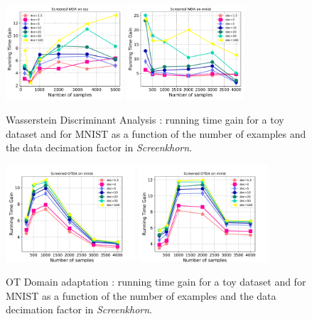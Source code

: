 \begin{figure}[t]
	\centering
	\includegraphics[width=0.39\textwidth]{./figs/wda_gain_toy.pdf}\hspace{1.5cm}
	\includegraphics[width=0.39\textwidth]{./figs/wda_gain_mnist.pdf}
	\caption{Wasserstein Discriminant Analysis : running time gain for a toy dataset and for MNIST as a function of the number of examples and the data decimation factor in \emph{Screenkhorn}.}
	\label{fig:wda}
\end{figure}
\begin{figure}[t]
	\centering

	\includegraphics[width=0.43\textwidth]{./figs/da_gain_mnist_regcl1.pdf}\hspace{1cm}
	\includegraphics[width=0.43\textwidth]{./figs/da_gain_mnist_regcl10.pdf}
	\caption{OT Domain adaptation : running time gain for a toy dataset and for MNIST as a function of the number of examples and the data decimation factor in \emph{Screenkhorn}.}
	\label{fig:otda}
\end{figure}

